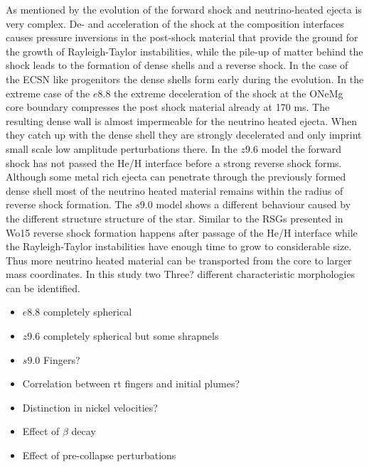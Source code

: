 \documentclass[fleqn,usenatbib]{mnras}
\newcommand{\COM}[1]{{\color{red}#1}}
\begin{document}
As mentioned by \citet{Wongwathanarat2015} the evolution of the forward shock and neutrino-heated ejecta is very complex. De- and acceleration of the shock at the composition interfaces causes pressure inversions in the post-shock material that provide the ground for the growth of Rayleigh-Taylor instabilities, while the pile-up of matter behind the shock leads to the formation of dense shells and a reverse shock. 
In the case of the ECSN like progenitors the dense shells form early during the evolution. In the extreme case of the $e8.8$ the extreme deceleration of the shock at the ONeMg core boundary compresses the post shock material already at 170 ms. The resulting dense wall is almost impermeable for the neutrino heated ejecta. When they catch up with the dense shell they are strongly decelerated and only imprint small scale low amplitude perturbations there. 
In the $z9.6$ model the forward shock has not passed the He/H interface before a strong reverse shock forms. Although some metal rich ejecta can penetrate through the previously formed dense shell most of the neutrino heated material remains within the radius of reverse shock formation.
The $s9.0$ model shows a different behaviour caused by the different structure structure of the star. Similar to the RSGs presented in Wo15 reverse shock formation happens after passage of the He/H interface while the Rayleigh-Taylor instabilities have enough time to grow to considerable size. Thus more neutrino heated material can be transported from the core to larger mass coordinates. 
In this study two \COM{Three?} different characteristic morphologies can be identified. 
\begin{itemize}
    \item \COM{$e8.8$ completely spherical}
    \item \COM{$z9.6$ completely spherical but some shrapnels }
    \item \COM{$s9.0$ Fingers?}
\end{itemize}
\begin{itemize}
    \item \COM{Correlation between rt fingers and initial plumes?}
    \item \COM{Distinction in nickel velocities?}
    \item \COM{Effect of $\beta$ decay}
    \item \COM{Effect of pre-collapse perturbations}
\end{itemize}
\end{document}
